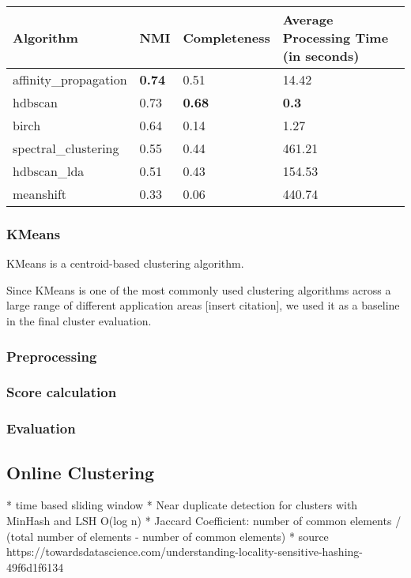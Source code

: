 \begin{table}[h]
    \centering
    \caption{}
    \label{undefined}
    \begin{tabular}{|l|l|l|l|}
    \hline
    \textbf{Algorithm} & \textbf{NMI} & \textbf{Completeness}  & \textbf{Average Processing Time (in seconds)} \\ \hline
    affinity\_propagation & \textbf{0.74} & 0.51 & 14.42 \\ \hline
    hdbscan & 0.73 & \textbf{0.68} & \textbf{0.3} \\ \hline
    birch & 0.64 & 0.14 & 1.27 \\ \hline
    spectral\_clustering & 0.55 & 0.44  & 461.21 \\ \hline
    hdbscan\_lda & 0.51 & 0.43 & 154.53 \\ \hline
    meanshift & 0.33 & 0.06  & 440.74 \\ \hline
    \end{tabular}
\end{table}

\subsubsection{KMeans}

KMeans is a centroid-based clustering algorithm. 


Since KMeans is one of the most commonly used clustering algorithms across a large range of different application areas [insert citation], we used it as a baseline in the final cluster evaluation.

\subsubsection{Preprocessing}


\subsubsection{Score calculation}

\subsubsection{Evaluation}




\subsection{Online Clustering}

* time based sliding window
* Near duplicate detection for clusters with MinHash and LSH O(log n)
* Jaccard Coefficient: number of common elements / (total number of elements - number of common elements)
* source https://towardsdatascience.com/understanding-locality-sensitive-hashing-49f6d1f6134

